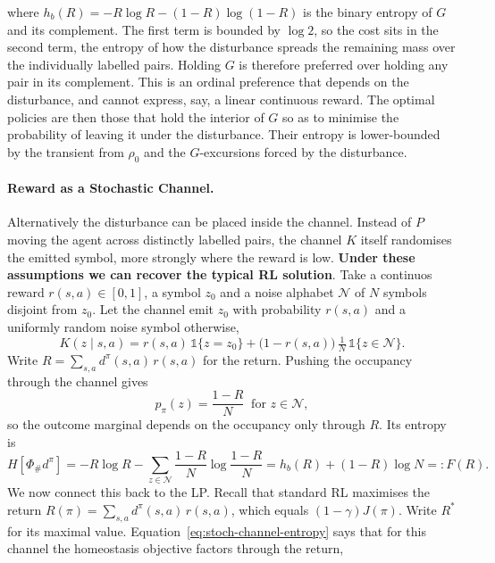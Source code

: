 \documentclass[11pt]{article}
\theoremstyle{remark}
\newcommand{\Ncal}{\mathcal N}
\newcommand{\1}{\mathds{1}}
\newcommand{\occ}{d^{\pi}}
\newcommand{\push}{\Phi_{\#}}
\newcommand{\pz}{p_{\pi}}
\newcommand{\Hf}[1]{H\!\left[#1\right]}
\begin{document}
where $h_b(R)=-R\log R-(1-R)\log(1-R)$ is the binary entropy of $G$ and its complement.
The first term is bounded by $\log 2$, so the cost sits in the second term, the entropy of how the disturbance spreads the remaining mass over the individually labelled pairs.
Holding $G$ is therefore preferred over holding any pair in its complement.
This is an ordinal preference that depends on the disturbance, and cannot express, say, a linear continuous reward.
The optimal policies are then those that hold the interior of $G$ so as to minimise the probability of leaving it under the disturbance.
Their entropy is lower-bounded by the transient from $\rho_0$ and the $G$-excursions forced by the disturbance.

\paragraph{Reward as a Stochastic Channel.}
Alternatively the disturbance can be placed inside the channel.
Instead of $P$ moving the agent across distinctly labelled pairs, the channel $K$ itself randomises the emitted symbol, more strongly where the reward is low.
\textbf{Under these assumptions we can recover the typical RL solution}.
Take a continuos reward $r(s,a)\in[0,1]$, a symbol $z_0$ and a noise alphabet $\Ncal$ of $N$ symbols disjoint from $z_0$.
Let the channel emit $z_0$ with probability $r(s,a)$ and a uniformly random noise symbol otherwise,
\begin{equation}
  K(z\mid s,a)=r(s,a)\,\1\{z=z_0\}+\big(1-r(s,a)\big)\,\tfrac{1}{N}\,\1\{z\in\Ncal\}.
  \label{eq:stoch-channel}
\end{equation}
Write $R=\sum_{s,a}\occ(s,a)\,r(s,a)$ for the return.
Pushing the occupancy through the channel gives
\begin{equation}
  \pz(z)=\frac{1-R}{N}\ \text{ for } z\in\Ncal,
\end{equation}
so the outcome marginal depends on the occupancy only through $R$.
Its entropy is
\begin{equation}
  \Hf{\push\occ}
  =-R\log R-\sum_{z\in\Ncal}\frac{1-R}{N}\log\frac{1-R}{N}
  =h_b(R)+(1-R)\log N=:F(R).
  \label{eq:stoch-channel-entropy}
\end{equation}
We now connect this back to the LP.
Recall that standard RL maximises the return $R(\pi)=\sum_{s,a}\occ(s,a)\,r(s,a)$, which equals $(1-\gamma)J(\pi)$.
Write $R^\ast$ for its maximal value.
Equation~\eqref{eq:stoch-channel-entropy} says that for this channel the homeostasis objective factors through the return,
\end{document}
